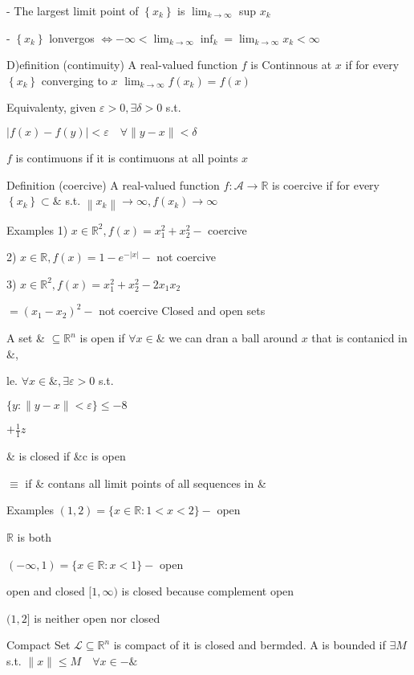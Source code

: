 \documentclass[11pt,a4paper]{article}
\begin{document}
- The largest limit point of $\left\{x_{k}\right\}$ is $\lim _{k \rightarrow \infty}$ sup $x_{k}$

- $\left\{x_{k}\right\}$ lonvergos $\Longleftrightarrow-\infty<\lim _{k \rightarrow \infty} \inf _{k}=\lim _{k \rightarrow \infty} x_{k}<\infty$

D)efinition (contimuity) A real-valued function $f$ is Continnous at $x$ if for every $\left\{x_{k}\right\}$ converging to $x$ $\lim _{k \rightarrow \infty} f\left(x_{k}\right)=f(x)$

Equivalenty, given $\varepsilon>0, \exists \delta>0$ s.t.

$|f(x)-f(y)|<\varepsilon \quad \forall\|y-x\|<\delta$

$f$ is contimuons if it is contimuons at all points $x$

Definition (coercive) A real-valued function $f: \mathcal{A} \rightarrow \mathbb{R}$ is coercive if for every $\left\{x_{k}\right\} \subset \&$ s.t. $\left\|x_{k}\right\| \rightarrow \infty, f\left(x_{k}\right) \rightarrow \infty$

Examples 1) $x \in \mathbb{R}^{2}, f(x)=x_{1}^{2}+x_{2}^{2}-$ coercive

2) $x \in \mathbb{R}, f(x)=1-e^{-|x|}-$ not coercive

3) $x \in \mathbb{R}^{2}, f(x)=x_{1}^{2}+x_{2}^{2}-2 x_{1} x_{2}$

$=\left(x_{1}-x_{2}\right)^{2}-$ not coercive Closed and open sets

A set \& $\subseteq \mathbb{R}^{n}$ is open if $\forall x \in \&$ we can dran a ball around $x$ that is contanicd in $\&$,

le. $\forall x \in \&, \exists \varepsilon>0$ s.t.

$\{y:\|y-x\|<\varepsilon\} \leq-8$

$+\frac{1}{1} z$

\& is closed if \&c is open

$\equiv$ if \& contans all limit points of all sequences in \&

Examples $(1,2)=\{x \in \mathbb{R}: 1<x<2\}-$ open

$\mathbb{R}$ is both

$(-\infty, 1)=\{x \in \mathbb{R}: x<1\}-$ open

open and closed $[1, \infty)$ is closed because complement open

$(1,2]$ is neither open nor closed

Compact Set $\mathcal{L} \subseteq \mathbb{R}^{n}$ is compact of it is closed and bermded. A is bounded if $\exists M$ s.t. $\|x\| \leqslant M \quad \forall x \in-\&$
\end{document}
